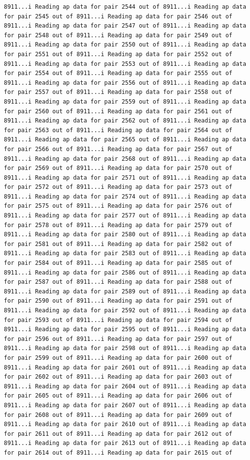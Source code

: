 \documentclass[
]{article}
\begin{document}
\begin{verbatim}
8911...i Reading ap data for pair 2544 out of 8911...i Reading ap data for pair 2545 out of 8911...i Reading ap data for pair 2546 out of 8911...i Reading ap data for pair 2547 out of 8911...i Reading ap data for pair 2548 out of 8911...i Reading ap data for pair 2549 out of 8911...i Reading ap data for pair 2550 out of 8911...i Reading ap data for pair 2551 out of 8911...i Reading ap data for pair 2552 out of 8911...i Reading ap data for pair 2553 out of 8911...i Reading ap data for pair 2554 out of 8911...i Reading ap data for pair 2555 out of 8911...i Reading ap data for pair 2556 out of 8911...i Reading ap data for pair 2557 out of 8911...i Reading ap data for pair 2558 out of 8911...i Reading ap data for pair 2559 out of 8911...i Reading ap data for pair 2560 out of 8911...i Reading ap data for pair 2561 out of 8911...i Reading ap data for pair 2562 out of 8911...i Reading ap data for pair 2563 out of 8911...i Reading ap data for pair 2564 out of 8911...i Reading ap data for pair 2565 out of 8911...i Reading ap data for pair 2566 out of 8911...i Reading ap data for pair 2567 out of 8911...i Reading ap data for pair 2568 out of 8911...i Reading ap data for pair 2569 out of 8911...i Reading ap data for pair 2570 out of 8911...i Reading ap data for pair 2571 out of 8911...i Reading ap data for pair 2572 out of 8911...i Reading ap data for pair 2573 out of 8911...i Reading ap data for pair 2574 out of 8911...i Reading ap data for pair 2575 out of 8911...i Reading ap data for pair 2576 out of 8911...i Reading ap data for pair 2577 out of 8911...i Reading ap data for pair 2578 out of 8911...i Reading ap data for pair 2579 out of 8911...i Reading ap data for pair 2580 out of 8911...i Reading ap data for pair 2581 out of 8911...i Reading ap data for pair 2582 out of 8911...i Reading ap data for pair 2583 out of 8911...i Reading ap data for pair 2584 out of 8911...i Reading ap data for pair 2585 out of 8911...i Reading ap data for pair 2586 out of 8911...i Reading ap data for pair 2587 out of 8911...i Reading ap data for pair 2588 out of 8911...i Reading ap data for pair 2589 out of 8911...i Reading ap data for pair 2590 out of 8911...i Reading ap data for pair 2591 out of 8911...i Reading ap data for pair 2592 out of 8911...i Reading ap data for pair 2593 out of 8911...i Reading ap data for pair 2594 out of 8911...i Reading ap data for pair 2595 out of 8911...i Reading ap data for pair 2596 out of 8911...i Reading ap data for pair 2597 out of 8911...i Reading ap data for pair 2598 out of 8911...i Reading ap data for pair 2599 out of 8911...i Reading ap data for pair 2600 out of 8911...i Reading ap data for pair 2601 out of 8911...i Reading ap data for pair 2602 out of 8911...i Reading ap data for pair 2603 out of 8911...i Reading ap data for pair 2604 out of 8911...i Reading ap data for pair 2605 out of 8911...i Reading ap data for pair 2606 out of 8911...i Reading ap data for pair 2607 out of 8911...i Reading ap data for pair 2608 out of 8911...i Reading ap data for pair 2609 out of 8911...i Reading ap data for pair 2610 out of 8911...i Reading ap data for pair 2611 out of 8911...i Reading ap data for pair 2612 out of 8911...i Reading ap data for pair 2613 out of 8911...i Reading ap data for pair 2614 out of 8911...i Reading ap data for pair 2615 out of 
\end{verbatim}
\end{document}
